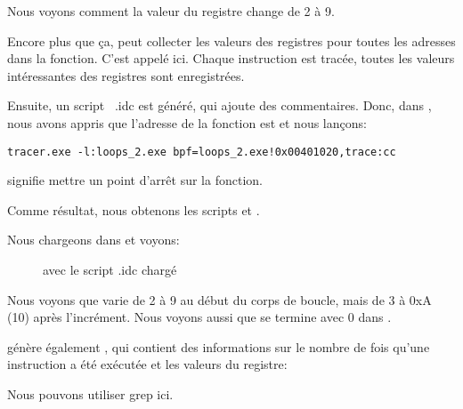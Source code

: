 

Nous voyons comment la valeur du registre \ESI change de 2 à 9.

Encore plus que ça, \tracer peut collecter les valeurs des registres pour toutes
les adresses dans la fonction. C'est appelé  ici. Chaque instruction est
tracée, toutes les valeurs intéressantes des registres sont enregistrées.

Ensuite, un script \IDA\ .idc est généré, qui ajoute des commentaires.
Donc, dans \IDA, nous avons appris que l'adresse de la fonction \main est 
et nous lançons:

\begin{lstlisting}
tracer.exe -l:loops_2.exe bpf=loops_2.exe!0x00401020,trace:cc
\end{lstlisting}

 signifie mettre un point d'arrêt sur la fonction.

Comme résultat, nous obtenons les scripts  et .

\clearpage
Nous chargeons  dans \IDA et voyons:

\begin{figure}[H]
\centering
{}
\caption{\IDA avec le script .idc chargé}
\label{fig:loops_IDA_tracer}
\end{figure}

Nous voyons que \ESI varie de 2 à 9 au début du corps de boucle, mais de 3 à
0xA (10) après l'incrément.
Nous voyons aussi que \main se termine avec 0 dans \EAX.

\tracer génère également , qui contient des informations sur
le nombre de fois qu'une instruction a été exécutée et les valeurs du registre:


\myindex{\GrepUsage}
Nous pouvons utiliser grep ici.


